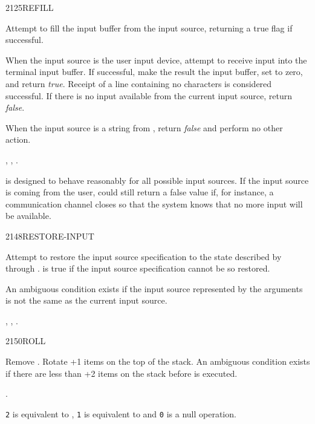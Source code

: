 \begin{worddef}{2125}{REFILL}
\item {}

	Attempt to fill the input buffer from the input source,
	returning a true flag if successful.

	When the input source is the user input device, attempt to
	receive input into the terminal input buffer. If successful,
	make the result the input buffer, set  to zero, and
	return \emph{true}. Receipt of a line containing no characters
	is considered successful. If there is no input available from
	the current input source, return \emph{false}.

	When the input source is a string from , return
	\emph{false} and perform no other action.

\see {},
	,
	.

	\begin{rationale} %
		 is designed to behave reasonably for all possible
		input sources. If the input source is coming from the user,
		 could still return a false value if, for instance,
		a communication channel closes so that the system knows that no
		more input will be available.
	\end{rationale}
\end{worddef}


\begin{worddef}{2148}{RESTORE-INPUT}
\item {}

	Attempt to restore the input source specification to the state
	described by  through .  is
	true if the input source specification cannot be so restored.

	An ambiguous condition exists if the input source represented
	by the arguments is not the same as the current input source.

\see {}, ,
	  .
\end{worddef}


\begin{worddef}{2150}{ROLL}
\item {}

	Remove . Rotate +1 items on the top of the stack.
	An ambiguous condition exists if there are less than +2
	items on the stack before  is executed.

\see {}.

	\begin{rationale} %
		\texttt{2}  is equivalent to ,
		\texttt{1}  is equivalent to  and
		\texttt{0}  is a null operation.
	\end{rationale}
\end{worddef}


